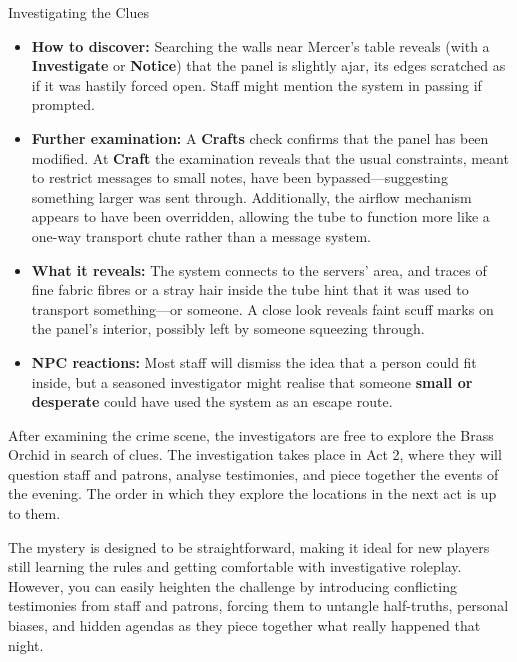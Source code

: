 \begin{WyrdComment}{Investigating the Clues}
	\begin{itemize}
		\item \textbf{How to discover:} Searching the walls near Mercer's table reveals (with a \Difficult \textbf{Investigate} or \textbf{Notice}) that the panel is slightly ajar, its edges scratched as if it was hastily forced open. Staff might mention the system in passing if prompted.
		\item \textbf{Further examination:} A \Challenging \textbf{Crafts} check confirms that the panel has been modified. At \Difficult \textbf{Craft} the examination reveals that the usual constraints, meant to restrict messages to small notes, have been bypassed—suggesting something larger was sent through. Additionally, the airflow mechanism appears to have been overridden, allowing the tube to function more like a one-way transport chute rather than a message system.
		\item \textbf{What it reveals:} The system connects to the servers' area, and traces of fine fabric fibres or a stray hair inside the tube hint that it was used to transport something—or someone. A close look reveals faint scuff marks on the panel's interior, possibly left by someone squeezing through.
		\item \textbf{NPC reactions:} Most staff will dismiss the idea that a person could fit inside, but a seasoned investigator might realise that someone \textbf{small or desperate} could have used the system as an escape route.
	\end{itemize}
\end{WyrdComment}

After examining the crime scene, the investigators are free to explore the Brass Orchid in search of clues. The investigation takes place in Act 2, where they will question staff and patrons, analyse testimonies, and piece together the events of the evening. The order in which they explore the locations in the next act is up to them.

\begin{WyrdGmTips}
	The mystery is designed to be straightforward, making it ideal for new players still learning the rules and getting comfortable with investigative roleplay. However, you can easily heighten the challenge by introducing conflicting testimonies from staff and patrons, forcing them to untangle half-truths, personal biases, and hidden agendas as they piece together what really happened that night.
\end{WyrdGmTips}
